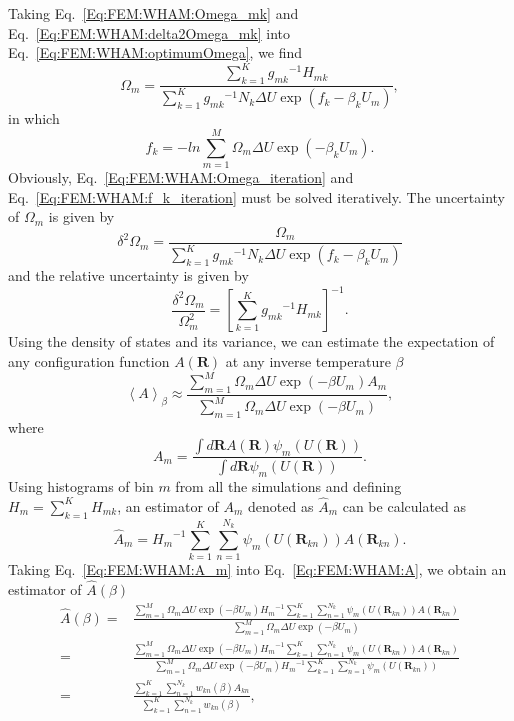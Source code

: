 Taking Eq.~\ref{Eq:FEM:WHAM:Omega_mk} and Eq.~\ref{Eq:FEM:WHAM:delta2Omega_mk} into Eq.~\ref{Eq:FEM:WHAM:optimumOmega}, we find
\begin{equation}
\Omega_m=\frac{\sum\limits_{k=1}^{K}{g_{mk}}^{-1}H_{mk}}{\sum\limits_{k=1}^{K}{g_{mk}}^{-1}N_k\Delta U\exp{(f_k-\beta_kU_m)}},
\label{Eq:FEM:WHAM:Omega_iteration}
\end{equation}
in which
\begin{equation}
f_k=-ln\sum\limits_{m=1}^M\Omega_m\Delta U\exp{(-\beta_kU_m)}.
\label{Eq:FEM:WHAM:f_k_iteration}
\end{equation}
Obviously, Eq.~\ref{Eq:FEM:WHAM:Omega_iteration} and Eq.~\ref{Eq:FEM:WHAM:f_k_iteration} must be solved iteratively.
The uncertainty of $\Omega_m$ is given by
\begin{equation}
\delta^2 \Omega_m=\frac{\Omega_m}{\sum\limits_{k=1}^K{g_{mk}}^{-1}N_k\Delta U\exp{(f_k-\beta_kU_m)}}
\end{equation}
and the relative uncertainty is given by
\begin{equation}
\frac{\delta^2\Omega_m}{\Omega_m^2}=\left[\sum\limits_{k=1}^K{g_{mk}}^{-1}H_{mk}\right]^{-1}.
\end{equation}
Using the density of states and its variance, we can estimate the expectation of any configuration function $A(\mathbf{R})$ at any inverse temperature $\beta$
\begin{equation}
\left<A\right>_\beta\approx\frac{\sum\limits_{m=1}^M\Omega_m\Delta U\exp{(-\beta U_m)}A_m}{\sum\limits_{m=1}^M\Omega_m\Delta U\exp{(-\beta U_m)}},
\label{Eq:FEM:WHAM:A}
\end{equation}
where
\begin{equation}
A_m=\frac{\int d\mathbf{R}A(\mathbf{R})\psi_m(U(\mathbf{R}))}{\int d\mathbf{R}\psi_m(U(\mathbf{R}))}.
\end{equation}
Using histograms of bin $m$ from all the simulations and defining $H_m=\sum\limits_{k=1}^KH_{mk}$, an estimator of $A_m$ denoted as $\hat{A}_m$ can be calculated as
\begin{equation}
   \hat{A}_m={H_{m}}^{-1}\sum\limits_{k=1}^K\sum\limits_{n=1}^{N_k}\psi_m(U(\mathbf{R}_{kn}))A(\mathbf{R}_{kn}).
   \label{Eq:FEM:WHAM:A_m}
\end{equation}
Taking Eq.~\ref{Eq:FEM:WHAM:A_m} into Eq.~\ref{Eq:FEM:WHAM:A}, we obtain an estimator of $\hat{A}(\beta)$
\begin{align}
\hat{A}(\beta)=&\frac{\sum\limits_{m=1}^M\Omega_m\Delta U\exp{(-\beta U_m)}{H_{m}}^{-1}\sum\limits_{k=1}^K\sum\limits_{n=1}^{N_k}\psi_m(U(\mathbf{R}_{kn}))A(\mathbf{R}_{kn})}{\sum\limits_{m=1}^M\Omega_m\Delta U\exp{(-\beta U_m)}}\\
              =&\frac{\sum\limits_{m=1}^M\Omega_m\Delta U\exp{(-\beta U_m)}{H_{m}}^{-1}\sum\limits_{k=1}^K\sum\limits_{n=1}^{N_k}\psi_m(U(\mathbf{R}_{kn}))A(\mathbf{R}_{kn})}{\sum\limits_{m=1}^M\Omega_m\Delta U\exp{(-\beta U_m)}{H_{m}}^{-1}\sum\limits_{k=1}^K\sum\limits_{n=1}^{N_k}\psi_m(U(\mathbf{R}_{kn}))}\\
              =&\frac{\sum\limits_{k=1}^K\sum\limits_{n=1}^{N_k}w_{kn}(\beta)A_{kn}}{\sum\limits_{k=1}^K\sum\limits_{n=1}^{N_k}w_{kn}(\beta)},
\end{align}
